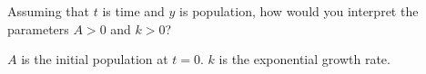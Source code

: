 Assuming that $t$ is time and $y$ is population, how would you interpret the parameters $A>0$ and $k>0$?

\begin{solution}
    $A$ is the initial population at $t=0$. $k$ is the exponential growth rate.
\end{solution}